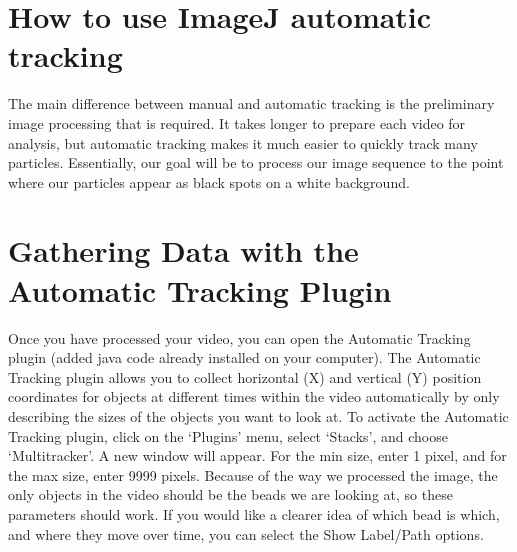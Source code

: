 \section{How to use ImageJ automatic tracking}
The main difference between manual and automatic tracking is the preliminary image processing that is required. 
It takes longer to prepare each video for analysis, but automatic tracking makes it much easier to quickly track many particles. 
Essentially, our goal will be to process our image sequence to the point where our particles appear as black spots on a white background.

\section*{Gathering Data with the Automatic Tracking Plugin}
Once you have processed your video, you can open the Automatic Tracking plugin (added java code already installed on your computer). 
The Automatic Tracking plugin allows you to collect horizontal (X) and vertical (Y) position coordinates for objects at different times within the video automatically by only describing the sizes of the objects you want to look at. 
To activate the Automatic Tracking plugin, click on the `Plugins' menu, select `Stacks', and choose `Multitracker'. 
A new window will appear. 
For the min size, enter 1 pixel, and for the max size, enter 9999 pixels. 
Because of the way we processed the image, the only objects in the video should be the beads we are looking at, so these parameters should work. 
If you would like a clearer idea of which bead is which, and where they move over time, you can select the Show Label/Path options.

